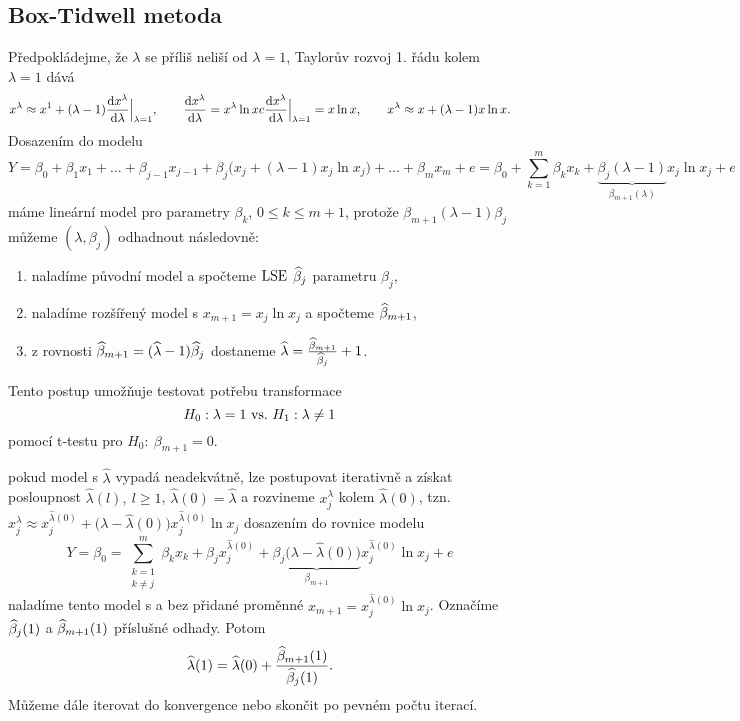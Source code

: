 \subsection*{Box-Tidwell metoda}
Předpokládejme, že $\lambda$ se příliš neliší od $\lambda=1$, Taylorův rozvoj 1. řádu kolem $\lambda=1$ dává
$$ x^\lambda\approx x^1+(\lambda-1)\frac{\mathrm{d} x^\lambda}{\mathrm{d} \lambda}\Big|_{\lambda=1},\qquad \frac{\mathrm{d} x^\lambda}{\mathrm{d} \lambda}=x^\lambda\ln x c \frac{\mathrm{d} x^\lambda}{\mathrm{d} \lambda}\Big|_{\lambda=1}=x\ln x,\qquad x^\lambda\approx x+(\lambda-1)x\ln x.$$
Dosazením do modelu 
$$ Y=\beta_0+\beta_1 x_1+...+\beta_{j-1}x_{j-1}+\beta_j\big(x_j+(\lambda-1)x_j\ln x_j\big)+...+\beta_m x_m+e=\beta_0+\sum_{k=1}^m \beta_k x_k+\underbrace{\beta_j(\lambda-1)}_{\beta_{m+1}(\lambda)}x_j\ln x_j+e$$
	máme lineární model pro parametry $\beta_k$, $0\leq k\leq m+1$, protože $\beta_{m+1}(\lambda-1)\beta_j$ můžeme $(\lambda,\beta_j)$ odhadnout následovně: \begin{enumerate}[1)]
		\item naladíme původní model a spočteme $\mathrm{LSE}$ $\widehat{\beta}_j$ parametru $\beta_j$,
		\item naladíme rozšířený model s $x_{m+1}=x_j\ln x_j$ a spočteme $\widehat{\beta}_{m+1}$,
		\item z rovnosti $\widehat{\beta}_{m+1}=(\widehat{\lambda}-1)\widehat{\beta}_j$ dostaneme $\widehat{\lambda}=\frac{\widehat{\beta}_{m+1}}{\widehat{\beta}_j}+1$.
	\end{enumerate}
Tento postup umožňuje testovat potřebu transformace
$$ H_0: \lambda=1 ~\text{vs.}~ H_1: \lambda\neq1$$
pomocí t-testu pro $H_0:~\beta_{m+1}=0$.
\begin{remark}
	pokud model s $\widehat{\lambda}$ vypadá neadekvátně, lze postupovat iterativně a získat posloupnost $\widehat{\lambda}(l),~l\geq1$, $\widehat{\lambda}(0)=\widehat{\lambda}$ a rozvineme $x_j^\lambda$ kolem $\widehat{\lambda}(0)$, tzn. $x_j^\lambda\approx x_j^{\widehat{\lambda}(0)}+\big(\lambda-\widehat{\lambda}(0)\big)x_j^{\widehat{\lambda}(0)}\ln x_j$ dosazením do rovnice modelu 
	$$ Y= \beta_0=\sum_{\substack{k=1 \\ k\neq j}}^m \beta_k x_k+\beta_j x_j^{\widehat{\lambda}(0)}+\underbrace{\beta_j\big(\lambda-\widehat{\lambda}(0)\big)}_{\beta_{m+1}}x_j^{\widehat{\lambda}(0)}\ln x_j+e$$ 
	naladíme tento model s a bez přidané proměnné $x_{m+1}=x_j^{\widehat{\lambda}(0)}\ln x_j$. Označíme $\widehat{\beta}_j(1)$ a $\widehat{\beta}_{m+1}(1)$ příslušné odhady. Potom
	$$ \widehat{\lambda}(1)=\widehat{\lambda}(0)+\frac{\widehat{\beta}_{m+1}(1)}{\widehat{\beta}_j(1)}.$$
		Můžeme dále iterovat do konvergence nebo skončit po pevném počtu iterací.
\end{remark}
